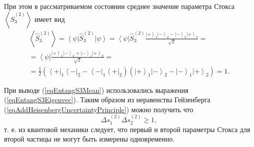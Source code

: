При этом в рассматриваемом состоянии среднее значение параметра Стокса
$\left<\hat{S}_3^{(2)}\right>$ имеет вид
\begin{eqnarray}
  \left<\hat{S}_3^{(2)}\right> =
  \left<\psi\right|\hat{S}_3^{(2)}\left|\psi\right> =
  \left<\psi\right|\hat{S}_3^{(2)}\frac{
    \left| + \right>_1\left| - \right>_2 -
    \left| - \right>_1\left| + \right>_2
  }{\sqrt{2}} =
  \nonumber \\
  = \left<\psi\right|\frac{
    \left| + \right>_1\left| - \right>_2 +
    \left| - \right>_1\left| + \right>_2
  }{\sqrt{2}} =
  \nonumber \\
  = \frac{1}{2} \left(
  \left< + \right|_1\left< - \right|_2 -
  \left< - \right|_1\left< + \right|_2
  \right)
  \left(
  \left| + \right>_1\left| - \right>_2 -
  \left| - \right>_1\left| + \right>_2
  \right) = 1.
  \label{eqEntangS3Mean}
\end{eqnarray}

При выводе (\ref{eqEntangS3Mean}) использовались выражения
(\ref{eqEntangS3Eigenvec}). Таким образом из неравенства Гейзенберга
(\ref{eqAddHeisenbergUncertaintyPrinciple}) можно получить что
\[
\Delta s_1^{(2)} \Delta s_2^{(2)} \ge 1,
\]
т. е. из квантовой механики следует, что первый и второй параметры
Стокса для второй частицы не могут быть измерены одновременно. 


